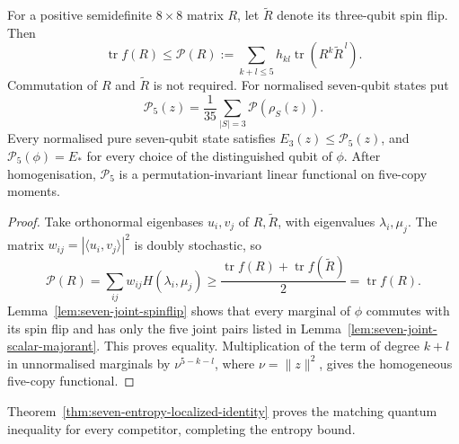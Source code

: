 \begin{proposition}
\label{prop:seven-joint-entropy-target}
For a positive semidefinite $8\times8$ matrix $R$, let $\widetilde R$ denote its three-qubit
spin flip. Then
\begin{equation}\label{eq:seven-joint-matrix-majorant}
 \operatorname{tr}f(R)\le
 \mathcal P(R):=\sum_{k+l\le5}h_{kl}
                         \operatorname{tr}(R^k\widetilde R^{\,l}).
\end{equation}
Commutation of $R$ and $\widetilde R$ is not required.
For normalised seven-qubit states put
\[
 \mathcal P_5(z)=\frac1{35}\sum_{|S|=3}\mathcal P(\rho_S(z)).
\]
Every normalised pure seven-qubit state satisfies $E_3(z)\le\mathcal P_5(z)$,
and $\mathcal P_5(\phi)=E_*$ for every choice of the distinguished qubit of $\phi$.
After homogenisation, $\mathcal P_5$ is a permutation-invariant
linear functional on five-copy moments.
\end{proposition}
\begin{proof}
Take orthonormal eigenbases $u_i,v_j$ of $R,\widetilde R$, with
eigenvalues $\lambda_i,\mu_j$. The matrix
$w_{ij}=|\langle u_i,v_j\rangle|^2$ is doubly stochastic, so
\[
 \mathcal P(R)=\sum_{ij}w_{ij}H(\lambda_i,\mu_j)
 \ge\frac{\operatorname{tr}f(R)+
                \operatorname{tr}f(\widetilde R)}2
 =\operatorname{tr}f(R).
\]
Lemma~\ref{lem:seven-joint-spinflip} shows that every
marginal of $\phi$ commutes with its spin flip and has only the five
joint pairs listed in Lemma~\ref{lem:seven-joint-scalar-majorant}.
This proves equality. Multiplication of the term of degree $k+l$ in unnormalised
marginals by $\nu^{5-k-l}$, where $\nu=\|z\|^2$, gives the homogeneous
five-copy functional.
\end{proof}

Theorem~\ref{thm:seven-entropy-localized-identity} proves the matching
quantum inequality for every competitor, completing the entropy bound.
